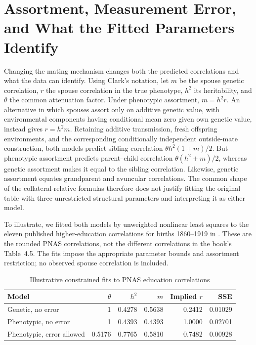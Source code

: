 \section{Assortment, Measurement Error, and What the Fitted Parameters Identify}
\label{sec:assortment-comparison}

Changing the mating mechanism changes both the predicted correlations and
what the data can identify. Using Clark's notation, let $m$ be the spouse
genetic correlation, $r$ the spouse correlation in the true phenotype,
$h^2$ its heritability, and $\theta$ the common attenuation factor. Under
phenotypic assortment, $m=h^2r$. An alternative in which spouses assort
only on additive genetic value, with environmental components having
conditional mean zero given own genetic value, instead gives $r=h^2m$.
Retaining additive transmission, fresh offspring environments, and the
corresponding conditionally independent outside-mate construction, both
models predict sibling correlation $\theta h^2(1+m)/2$. But phenotypic
assortment predicts parent--child correlation $\theta(h^2+m)/2$, whereas
genetic assortment makes it equal to the sibling correlation. Likewise,
genetic assortment equates grandparent and avuncular correlations.
The common shape of the collateral-relative formulas therefore does not
justify fitting the original table with three unrestricted structural
parameters and interpreting it as either model.

To illustrate, we fitted both models by unweighted nonlinear least squares
to the eleven published higher-education correlations for births
1860--1919 in \citet[Table~2]{Clark2023}. These are the rounded PNAS
correlations, not the different correlations in the book's Table~4.5.
The fits impose the appropriate parameter bounds and assortment
restriction; no observed spouse correlation is included.

\begin{table}[htbp]
\centering
\caption{Illustrative constrained fits to PNAS education correlations}
\label{tab:assortment-comparison}
\begin{tabular}{lrrrrr}
\hline
Model & $\theta$ & $h^2$ & $m$ & Implied $r$ & SSE\\
\hline
Genetic, no error & 1 & 0.4278 & 0.5638 & 0.2412 & 0.01029\\
Phenotypic, no error & 1 & 0.4393 & 0.4393 & 1.0000 & 0.02701\\
Phenotypic, error allowed & 0.5176 & 0.7765 & 0.5810 & 0.7482 & 0.00928\\
\hline
\end{tabular}
\end{table}

